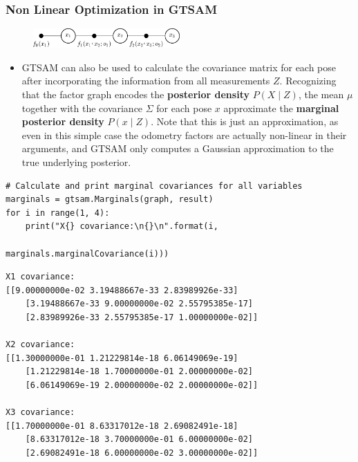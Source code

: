 \begin{frame}[fragile]
    \frametitle{Non Linear Optimization in GTSAM}

    \scriptsize

    \begin{figure}[!h]
        \includegraphics[width=0.5\textwidth]{./images/gtsam/factor_graph_odometry.pdf}
    \end{figure}

    \begin{itemize}
        \item GTSAM can also be used to calculate the covariance matrix for each pose after incorporating the information from all measurements $Z$. Recognizing that the factor graph encodes the \textbf{posterior density} $P(X \mid Z)$, the mean $\mu$ together with the covariance $\Sigma$ for each pose $x$ approximate the \textbf{marginal posterior density} $P(x \mid Z)$. Note that this is just an approximation, as even in this simple case the odometry factors are actually non-linear in their arguments, and GTSAM only computes a Gaussian approximation to the true underlying posterior.
    \end{itemize}


\begin{lstlisting}[style=python] 
# Calculate and print marginal covariances for all variables
marginals = gtsam.Marginals(graph, result)
for i in range(1, 4):
    print("X{} covariance:\n{}\n".format(i,
                                        marginals.marginalCovariance(i)))
\end{lstlisting}

\tiny

\begin{lstlisting}[style=bash] 
X1 covariance:
[[9.00000000e-02 3.19488667e-33 2.83989926e-33]
    [3.19488667e-33 9.00000000e-02 2.55795385e-17]
    [2.83989926e-33 2.55795385e-17 1.00000000e-02]]

X2 covariance:
[[1.30000000e-01 1.21229814e-18 6.06149069e-19]
    [1.21229814e-18 1.70000000e-01 2.00000000e-02]
    [6.06149069e-19 2.00000000e-02 2.00000000e-02]]

X3 covariance:
[[1.70000000e-01 8.63317012e-18 2.69082491e-18]
    [8.63317012e-18 3.70000000e-01 6.00000000e-02]
    [2.69082491e-18 6.00000000e-02 3.00000000e-02]]
\end{lstlisting}

\end{frame}